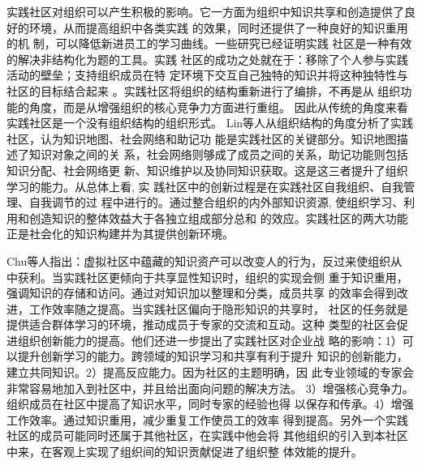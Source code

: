 \documentclass[12pt,a4paper]{ctexart}
\begin{document}
实践社区对组织可以产生积极的影响。它一方面为组织中知识共享和创造提供了良好的环境，从而提高组织中各类实践
的效果\cite{lesser2001ucp}，同时还提供了一种良好的知识重用的机
制，可以降低新进员工的学习曲线\cite{dube2005isc}。一些研究已经证明实践
社区是一种有效的解决非结构化为题的工具\cite{vonwartburg2004csa}。实践
社区的成功之处就在于：移除了个人参与实践活动的壁垒；支持组织成员在特
定环境下交互自己独特的知识并将这种独特性与社区的目标结合起来
\cite{ardichvili2003mab}。实践社区将组织的结构重新进行了编排，不再是从
组织功能的角度，而是从增强组织的核心竞争力方面进行重组\cite{Pan2003}。
因此从传统的角度来看实践社区是一个没有组织结构的组织形式\cite{lesser2001cpa}。
Lin等人从组织结构的角度分析了实践社区，认为知识地图、社会网络和助记功
能是实践社区的关键部分\cite{lin2001cmv}。知识地图描述了知识对象之间的关
系，社会网络则够成了成员之间的关系，助记功能则包括知识分配、社会网络更
新、知识维护以及协同知识获取。这是这三者提升了组织学习的能力。从总体上看, 实
践社区中的创新过程是在实践社区自我组织、自我管理、自我调节的过
程中进行的。通过整合组织的内外部知识资源, 使组织学习、利
用和创造知识的整体效益大于各独立组成部分总和
的效应。实践社区的两大功能正是社会化的知识构建并为其提供创新环境。

Chu等人指出：虚拟社区中蕴藏的知识资产可以改变人的行为，反过来使组织从
中获利\cite{Chu2008}。当实践社区更倾向于共享显性知识时，组织的实现会侧
重于知识重用，强调知识的存储和访问。通过对知识加以整理和分类，成员共享
的效率会得到改进，工作效率随之提高。当实践社区偏向于隐形知识的共享时，
社区的任务就是提供适合群体学习的环境，推动成员于专家的交流和互动。这种
类型的社区会促进组织创新能力的提高。他们还进一步提出了实践社区对企业战
略的影响：1）可以提升创新学习的能力。跨领域的知识学习和共享有利于提升
知识的创新能力，建立共同知识。2）提高反应能力。因为社区的主题明确，因
此专业领域的专家会非常容易地加入到社区中，并且给出面向问题的解决方法。
3）增强核心竞争力。组织成员在社区中提高了知识水平，同时专家的经验也得
以保存和传承。4）增强工作效率。通过知识重用，减少重复工作使员工的效率
得到提高。另外一个实践社区的成员可能同时还属于其他社区，在实践中他会将
其他组织的引入到本社区中来，在客观上实现了组织间的知识贡献促进了组织整
体效能的提升\cite{Garrety2004}。
\end{document}
